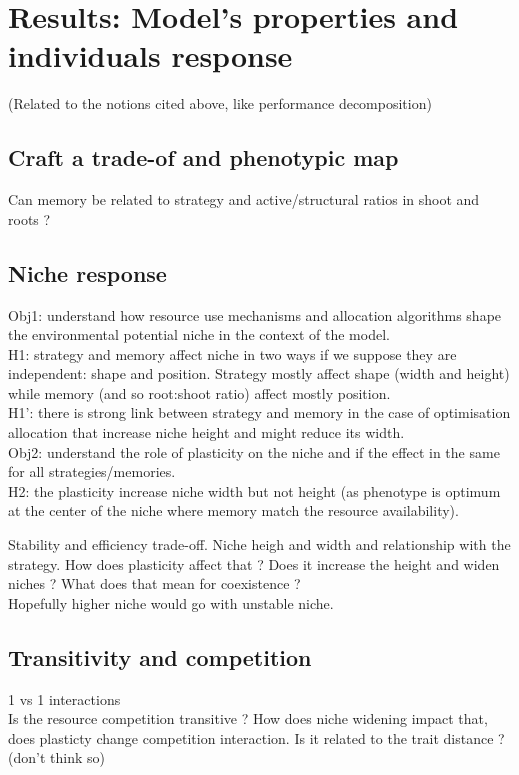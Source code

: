 
\chapter{Results: Model's properties and individuals response}
(Related to the notions cited above, like performance decomposition)

\section{Craft a trade-of and phenotypic map}
Can memory be related to strategy and active/structural ratios in shoot and roots ?

\section{Niche response}
Obj1: understand how resource use mechanisms and allocation algorithms shape the environmental potential niche in the context of the model.\\
H1: strategy and memory affect niche in two ways if we suppose they are independent: shape and position. Strategy mostly affect shape (width and height) while memory (and so root:shoot ratio) affect mostly position.\\
H1': there is strong link between strategy and memory in the case of optimisation allocation that increase niche height and might reduce its width.\\
Obj2: understand the role of plasticity on the niche and if the effect in the same for all strategies/memories.\\
H2: the plasticity increase niche width but not height (as phenotype is optimum at the center of the niche where memory match the resource availability).

Stability and efficiency trade-off. Niche heigh and width and relationship with the strategy. How does plasticity affect that ? Does it increase the height and widen niches ? What does that mean for coexistence ?\\
Hopefully higher niche would go with unstable niche.

\section{Transitivity and competition}
1 vs 1 interactions\\
Is the resource competition transitive ? How does niche widening impact that, does plasticty change competition interaction. Is it related to the trait distance ? (don't think so)
